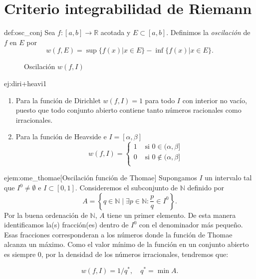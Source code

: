  \section{Criterio integrabilidad de Riemann}
  
 
\begin{definicion}[Oscilación]{def:osc_conj} Sea $f:[a,b]\to\mathbb{R}$ acotada y $E\subset [a,b]$. Definimos la \emph{oscilación} de $f$ en $E$ por 
\[
 w(f,E)=\sup\{f(x)| x\in E\}-\inf\{f(x)| x\in E\}.
\]
\end{definicion}
\begin{figure}[h]
 \begin{center}
 \def\svgwidth{6cm}

 \end{center}
 \caption{Oscilación $w(f,I)$}\label{fig:paral-trig}
\end{figure}

\begin{ejemplo}{ej:diri+heavi1} 
\begin{enumerate}
 \item Para la función de Dirichlet $w(f,I)=1$ para todo $I$ con interior no vacío, puesto que todo conjunto abierto contiene tanto números racionales como irracionales.
 \item Para la función de Heavside e $I=[\alpha,\beta]$
 \[
  w(f,I)=\begin{cases}
          1 & \text{ si } 0\in (\alpha,\beta]\\
          0 & \text{ si } 0\notin (\alpha,\beta]\\
         \end{cases}
 \]
\end{enumerate}
\end{ejemplo}


 


\begin{ejemplo}{ejem:ome_thomae}[Oscilación función de Thomae] Supongamos $I$ un intervalo tal que  $I^0\neq\emptyset$  e $I\subset [0,1]$. Consideremos el subconjunto de $\mathbb{N}$ definido por 
$$A=\left\{q\in\mathbb{N}\mid \exists p\in\mathbb{N}: \frac{p}{q}\in I^0\right\}.$$
Por la buena ordenación de $\mathbb{N}$, $A$ tiene un primer elemento. De esta manera identificamos la(s) fracción(es) dentro de $I^0$ con el denominador más pequeño. Esas fracciones corresponderan a los números donde la función de Thomae alcanza un máximo. Como el valor mínimo de la función en un conjunto abierto es siempre $0$, por la densidad de los números irracionales, tendremos que:  

     \begin{equation}\label{eq:osc_tho}
      w(f,I)=1/q^*,\quad  q^*=\min A. 
     \end{equation}



\end{ejemplo}

